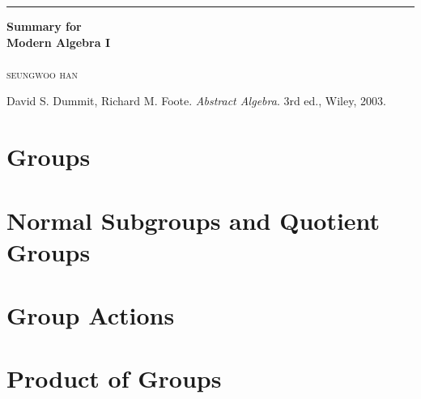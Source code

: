 \documentclass[a4paper,12pt]{report}
\begin{document}

\begin{titlepage}
	\raggedleft

	\rule{1pt}{\textheight}
	\hspace{0.05\textwidth}
	\parbox[b]{0.75\textwidth}{

        {\Huge\bfseries Summary for\\[0.5\baselineskip] Modern Algebra I}\\[2\baselineskip]
		\\[4\baselineskip]
		{\Large\textsc{seungwoo han}}

		\vspace{0.5\textheight}

        {\noindent
        David S. Dummit, Richard M. Foote.
        \textit{Abstract Algebra}. \newline
        3rd ed., Wiley, 2003.}
	}
\end{titlepage}
\tableofcontents
\hypersetup{
    linkcolor=red!50!black,
    filecolor=black,
    urlcolor=red!50!black,
}
\pagebreak

\chapter{Groups}







\chapter{Normal Subgroups and Quotient Groups}





\chapter{Group Actions}





\chapter{Product of Groups}




\end{document}
